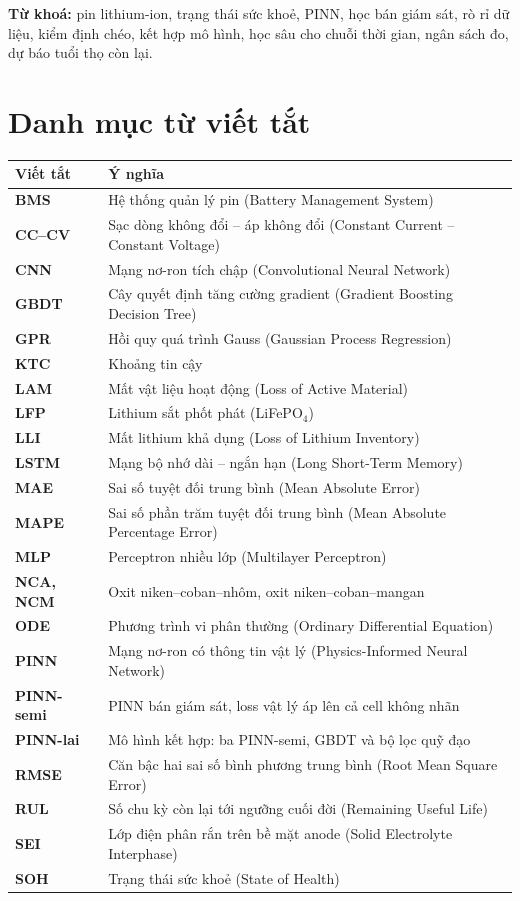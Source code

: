\documentclass[12pt,a4paper,oneside]{report}
\theoremstyle{plain}
\theoremstyle{definition}
\begin{document}
\noindent\textbf{Từ khoá:} pin lithium-ion, trạng thái sức khoẻ, PINN, học bán giám sát, rò rỉ dữ liệu, kiểm định chéo,
kết hợp mô hình, học sâu cho chuỗi thời gian, ngân sách đo, dự báo tuổi thọ còn lại.
{\linespread{1.0}\selectfont\tableofcontents\listoffigures\listoftables}
\chapter*{Danh mục từ viết tắt}
\begin{center}\small
\begin{tabular}{>{\bfseries}l l}
\toprule
Viết tắt & Ý nghĩa \\
\midrule
BMS & Hệ thống quản lý pin (Battery Management System)\\
CC--CV & Sạc dòng không đổi -- áp không đổi (Constant Current -- Constant Voltage)\\
CNN & Mạng nơ-ron tích chập (Convolutional Neural Network)\\
GBDT & Cây quyết định tăng cường gradient (Gradient Boosting Decision Tree)\\
GPR & Hồi quy quá trình Gauss (Gaussian Process Regression)\\
KTC & Khoảng tin cậy\\
LAM & Mất vật liệu hoạt động (Loss of Active Material)\\
LFP & Lithium sắt phốt phát (LiFePO$_4$)\\
LLI & Mất lithium khả dụng (Loss of Lithium Inventory)\\
LSTM & Mạng bộ nhớ dài -- ngắn hạn (Long Short-Term Memory)\\
MAE & Sai số tuyệt đối trung bình (Mean Absolute Error)\\
MAPE & Sai số phần trăm tuyệt đối trung bình (Mean Absolute Percentage Error)\\
MLP & Perceptron nhiều lớp (Multilayer Perceptron)\\
NCA, NCM & Oxit niken--coban--nhôm, oxit niken--coban--mangan\\
ODE & Phương trình vi phân thường (Ordinary Differential Equation)\\
PINN & Mạng nơ-ron có thông tin vật lý (Physics-Informed Neural Network)\\
PINN-semi & PINN bán giám sát, loss vật lý áp lên cả cell không nhãn\\
PINN-lai & Mô hình kết hợp: ba PINN-semi, GBDT và bộ lọc quỹ đạo\\
RMSE & Căn bậc hai sai số bình phương trung bình (Root Mean Square Error)\\
RUL & Số chu kỳ còn lại tới ngưỡng cuối đời (Remaining Useful Life)\\
SEI & Lớp điện phân rắn trên bề mặt anode (Solid Electrolyte Interphase)\\
SOH & Trạng thái sức khoẻ (State of Health)\\
\bottomrule
\end{tabular}
\end{center}
\end{document}
